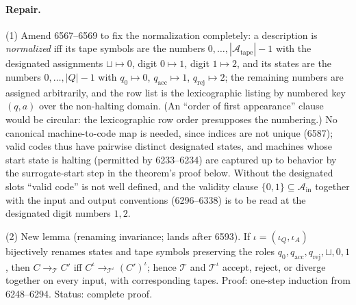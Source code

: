 \paragraph{Repair.} (1) Amend 6567--6569 to fix the normalization completely: a description is \emph{normalized} iff its tape symbols are the numbers \(0,\dots,|\mathcal A_{\mathrm{tape}}|-1\) with the designated assignments \(\sqcup\mapsto0\), digit \(0\mapsto1\), digit \(1\mapsto2\), and its states are the numbers \(0,\dots,|Q|-1\) with \(q_0\mapsto0\), \(q_{\mathrm{acc}}\mapsto1\), \(q_{\mathrm{rej}}\mapsto2\); the remaining numbers are assigned arbitrarily, and the row list is the lexicographic listing by numbered key \((q,a)\) over the non-halting domain.  (An ``order of first appearance'' clause would be circular: the lexicographic row order presupposes the numbering.)  No canonical machine-to-code map is needed, since indices are not unique (6587); valid codes thus have pairwise distinct designated states, and machines whose start state is halting (permitted by 6233--6234) are captured up to behavior by the surrogate-start step in the theorem's proof below.  Without the designated slots ``valid code'' is not well defined, and the validity clause \(\{0,1\}\subseteq\mathcal A_{\mathrm{in}}\) together with the input and output conventions (6296--6338) is to be read at the designated digit numbers \(1,2\).

(2) New lemma (renaming invariance; lands after 6593).  If \(\iota=(\iota_Q,\iota_A)\) bijectively renames states and tape symbols preserving the roles \(q_0,q_{\mathrm{acc}},q_{\mathrm{rej}},\sqcup,0,1\), then \(C\to_{\mathcal T}C'\) iff \(C^\iota\to_{\mathcal T^\iota}(C')^\iota\); hence \(\mathcal T\) and \(\mathcal T^\iota\) accept, reject, or diverge together on every input, with corresponding tapes.  Proof: one-step induction from 6248--6294.  Status: complete proof.

